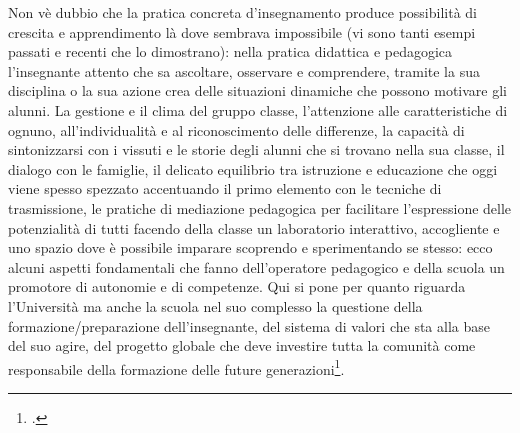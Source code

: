Non vè dubbio che la pratica concreta d'insegnamento produce possibilità di crescita e apprendimento là dove sembrava impossibile (vi sono tanti esempi passati e recenti che lo dimostrano): nella pratica didattica e pedagogica l'insegnante attento che sa ascoltare, osservare e comprendere, tramite la sua disciplina o la sua azione crea delle situazioni dinamiche che possono motivare gli alunni. La gestione e il clima del gruppo classe, l'attenzione alle caratteristiche di ognuno, all'individualità e al riconoscimento delle differenze, la capacità di sintonizzarsi con i vissuti e le storie degli alunni che si trovano nella sua classe, il dialogo con le famiglie, il delicato equilibrio tra istruzione e educazione che oggi viene spesso spezzato accentuando il primo elemento con le tecniche di trasmissione, le pratiche di mediazione pedagogica per facilitare l'espressione delle potenzialità di tutti facendo della classe un laboratorio interattivo, accogliente e uno spazio dove è possibile imparare scoprendo e sperimentando se stesso: ecco alcuni aspetti fondamentali che fanno dell'operatore pedagogico e della scuola un promotore di autonomie e di competenze. Qui si pone per quanto riguarda l'Università ma anche la scuola nel suo complesso la questione della formazione/preparazione dell'insegnante, del sistema di valori che sta alla base del suo agire, del progetto globale che deve investire tutta la comunità come responsabile della formazione delle future generazioni\footcite{Goussot2013a}.   
